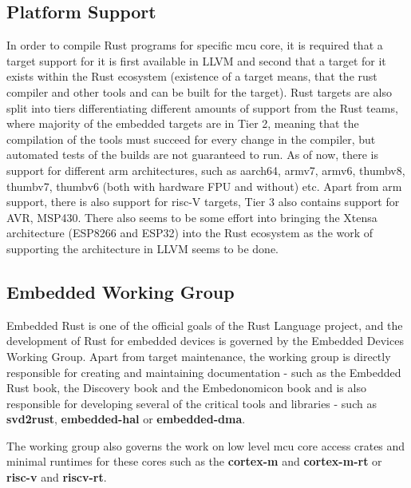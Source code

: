 \subsection{Platform Support}
\label{subsec:platform_support}
In order to compile Rust programs for specific \acs{mcu} core, it is required that a target support for it is first available in LLVM and second that a target for it exists within the Rust ecosystem (existence of a target means, that the rust compiler and other tools and can be built for the target).
Rust targets are also split into tiers differentiating different amounts of support from the Rust teams, where majority of the embedded targets are in Tier 2, meaning that the compilation of the tools must succeed for every change in the compiler, but automated tests of the builds are not guaranteed to run.
As of now, there is support for different \acs{arm} architectures, such as aarch64, armv7, armv6, thumbv8, thumbv7, thumbv6 (both with hardware FPU and without) etc\cite{noauthor_platform_nodate}.
Apart from \acs{arm} support, there is also support for \acs{risc}-V targets, Tier 3 also contains support for AVR\cite{noauthor_platform_nodate, rahul_how_nodate}, MSP430.
There also seems to be some effort into bringing the Xtensa architecture (ESP8266 and ESP32)\cite{mabin_mabezdevxtensa-rust-quickstart_2021} into the Rust ecosystem as the work of supporting the architecture in LLVM seems to be done.

\subsection{Embedded Working Group}
\label{subsec:embedded_wg}
Embedded Rust is one of the official goals of the Rust Language project, and the development of Rust for embedded devices is governed by the Embedded Devices Working Group\cite{noauthor_embedded_nodate}.
Apart from target maintenance, the working group is directly responsible for creating and maintaining documentation - such as the Embedded Rust book\cite{rust_embedded_devices_wg_introduction_2021}, the Discovery book\cite{rust_embedded_devices_wg_introduction_nodate} and the Embedonomicon book\cite{rust_embedded_devices_wg_preface_nodate} and is also responsible for developing several of the critical tools and libraries - such as \textbf{svd2rust}, \textbf{embedded-hal} or \textbf{embedded-dma}.

The working group also governs the work on low level \acs{mcu} core access crates and minimal runtimes for these cores such as the \textbf{cortex-m} and \textbf{cortex-m-rt} or \textbf{risc-v} and \textbf{riscv-rt}.

